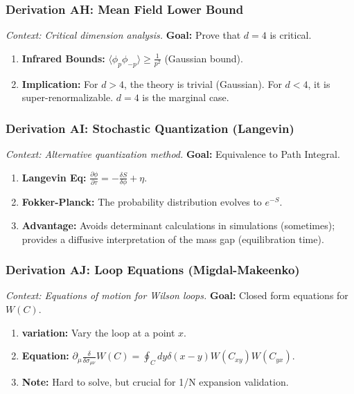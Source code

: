 \subsubsection{Derivation AH: Mean Field Lower Bound}
\textit{Context: Critical dimension analysis.}
\textbf{Goal:} Prove that $d=4$ is critical.
\begin{enumerate}
    \item \textbf{Infrared Bounds:} $\langle \phi_p \phi_{-p} \rangle \ge \frac{1}{p^2}$ (Gaussian bound).
    \item \textbf{Implication:} For $d>4$, the theory is trivial (Gaussian). For $d<4$, it is super-renormalizable. $d=4$ is the marginal case.
\end{enumerate}

\subsubsection{Derivation AI: Stochastic Quantization (Langevin)}
\textit{Context: Alternative quantization method.}
\textbf{Goal:} Equivalence to Path Integral.
\begin{enumerate}
    \item \textbf{Langevin Eq:} $\frac{\partial \phi}{\partial \tau} = -\frac{\delta S}{\delta \phi} + \eta$.
    \item \textbf{Fokker-Planck:} The probability distribution evolves to $e^{-S}$.
    \item \textbf{Advantage:} Avoids determinant calculations in simulations (sometimes); provides a diffusive interpretation of the mass gap (equilibration time).
\end{enumerate}

\subsubsection{Derivation AJ: Loop Equations (Migdal-Makeenko)}
\textit{Context: Equations of motion for Wilson loops.}
\textbf{Goal:} Closed form equations for $W(C)$.
\begin{enumerate}
    \item \textbf{variation:} Vary the loop at a point $x$.
    \item \textbf{Equation:} $\partial_\mu \frac{\delta}{\delta \sigma_{\mu\nu}} W(C) = \oint_C dy \delta(x-y) W(C_{xy}) W(C_{yx})$.
    \item \textbf{Note:} Hard to solve, but crucial for 1/N expansion validation.
\end{enumerate}

